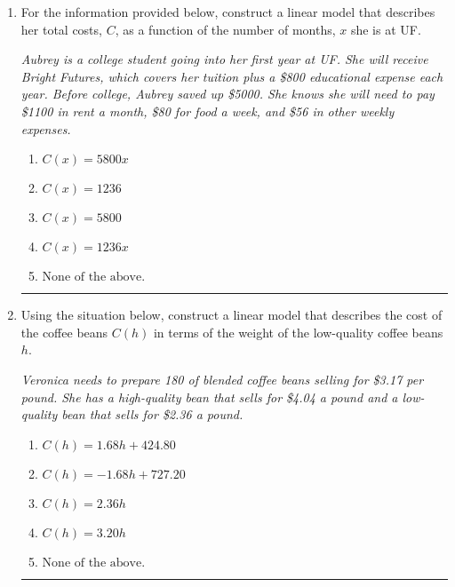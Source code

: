 \documentclass[14pt]{extbook}
\newcommand{\litem}[1]{\item#1\hspace*{-1cm}\rule{\textwidth}{0.4pt}}
\begin{document}
\begin{enumerate}
{\begin{enumerate}[label=\Alph*.]
\end{enumerate} }
\litem{
For the information provided below, construct a linear model that describes her total costs, $C$, as a function of the number of months, $x$ she is at UF. 
\begin{center}
    \textit{ Aubrey is a college student going into her first year at UF. She will receive Bright Futures, which covers her tuition plus a \$800 educational expense each year. Before college, Aubrey saved up \$5000. She knows she will need to pay \$1100 in rent a month, \$80 for food a week, and \$56 in other weekly expenses. }
\end{center}
\begin{enumerate}[label=\Alph*.]
\item \( C(x) = 5800 x \)
\item \( C(x) = 1236 \)
\item \( C(x) = 5800 \)
\item \( C(x) = 1236 x \)
\item \( \text{None of the above.} \)

\end{enumerate} }
\litem{
Using the situation below, construct a linear model that describes the cost of the coffee beans $C(h)$ in terms of the weight of the low-quality coffee beans $h$.
\begin{center}
    \textit{ Veronica needs to prepare 180 of blended coffee beans selling for \$3.17 per pound. She has a high-quality bean that sells for \$4.04 a pound and a low-quality bean that sells for \$2.36 a pound. }
\end{center}
\begin{enumerate}[label=\Alph*.]
\item \( C(h) = 1.68 h + 424.80 \)
\item \( C(h) = -1.68 h + 727.20 \)
\item \( C(h) = 2.36 h \)
\item \( C(h) = 3.20 h \)
\item \( \text{None of the above.} \)


\end{enumerate}}
\end{enumerate}
\end{document}
